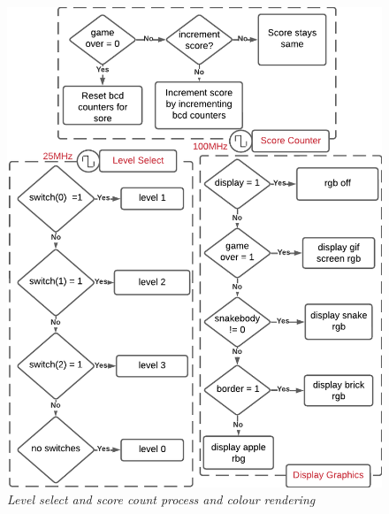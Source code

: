 \documentclass[aps, secnumarabic, balancelastpage, asmath, amssymb, nofootinbib, floatfix,]{revtex4-2}
\begin{document}
{\begin{figure}
    \centering
    \includegraphics[scale = 0.65]{score.pdf}
    \caption{\em Level select and score count process and colour rendering}
    \label{fig:4}
\end{figure}

}
\end{document}
